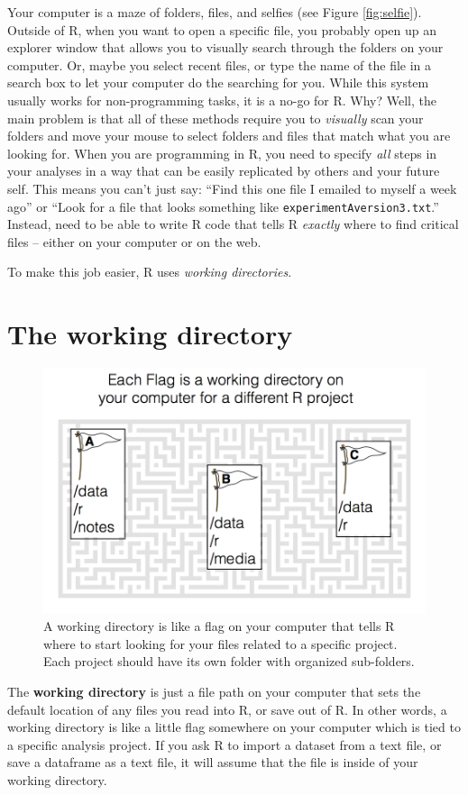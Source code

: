 \documentclass[]{book}
\theoremstyle{definition}
\theoremstyle{definition}
\theoremstyle{remark}
\begin{document}
Your computer is a maze of folders, files, and selfies (see Figure
\ref{fig:selfie}). Outside of R, when you want to open a specific file,
you probably open up an explorer window that allows you to visually
search through the folders on your computer. Or, maybe you select recent
files, or type the name of the file in a search box to let your computer
do the searching for you. While this system usually works for
non-programming tasks, it is a no-go for R. Why? Well, the main problem
is that all of these methods require you to \emph{visually} scan your
folders and move your mouse to select folders and files that match what
you are looking for. When you are programming in R, you need to specify
\emph{all} steps in your analyses in a way that can be easily replicated
by others and your future self. This means you can't just say: ``Find
this one file I emailed to myself a week ago'' or ``Look for a file that
looks something like \texttt{experimentAversion3.txt}.'' Instead, need
to be able to write R code that tells R \emph{exactly} where to find
critical files -- either on your computer or on the web.

To make this job easier, R uses \emph{working directories}.

\section{The working directory}\label{the-working-directory}

\begin{figure}

{\centering \includegraphics[width=0.5\linewidth]{images/mazeflag} 

}

\caption{A working directory is like a flag on your computer that tells R where to start looking for your files related to a specific project. Each project should have its own folder with organized sub-folders.}\label{fig:mazeflag}
\end{figure}

The \textbf{working directory} is just a file path on your computer that
sets the default location of any files you read into R, or save out of
R. In other words, a working directory is like a little flag somewhere
on your computer which is tied to a specific analysis project. If you
ask R to import a dataset from a text file, or save a dataframe as a
text file, it will assume that the file is inside of your working
directory.
\end{document}
